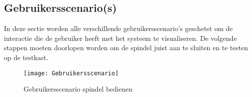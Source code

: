 \newpage

\subsection{Gebruikersscenario(s)}

In deze sectie worden alle verschillende gebruikersscenario’s geschetst om de interactie die de gebruiker heeft met het systeem te visualiseren. De volgende stappen moeten doorlopen worden om de spindel juist aan te sluiten en te testen op de testkast.

\begin{figure}[H]
	\centering
	\texttt{[image: Gebruikersscenario]}
	\label{fig:Gebruikersscenario}
	\caption{Gebruikersscenario spindel bedienen}
\end{figure}